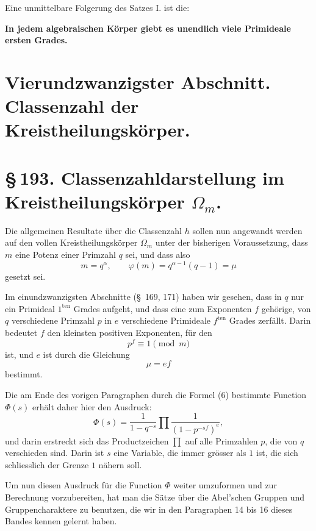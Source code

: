 \documentclass[11pt]{article}
\begin{document}
Eine unmittelbare Folgerung des Satzes I. ist die:
\begin{center}
\textbf{In jedem algebraischen Körper giebt es unendlich viele Primideale ersten Grades.}
\end{center}

\section*{Vierundzwanzigster Abschnitt.\\Classenzahl der Kreistheilungskörper.}
\section*{\S\,193. Classenzahldarstellung im Kreistheilungskörper $\Omega_m$.}

Die allgemeinen Resultate über die Classenzahl $h$ sollen nun angewandt werden auf den vollen Kreistheilungskörper $\Omega_m$ unter der bisherigen Voraussetzung, dass $m$ eine Potenz einer Primzahl $q$ sei, und dass also
\begin{equation}
m=q^\alpha,\qquad \varphi(m)=q^{\alpha-1}(q-1)=\mu
\tag{1}
\end{equation}
gesetzt sei.

Im einundzwanzigsten Abschnitte (\S~169, 171) haben wir gesehen, dass in $q$ nur ein Primideal $1^{\mathrm{ten}}$ Grades aufgeht, und dass eine zum Exponenten $f$ gehörige, von $q$ verschiedene Primzahl $p$ in $e$ verschiedene Primideale $f^{\mathrm{ten}}$ Grades zerfällt. Darin bedeutet $f$ den kleinsten positiven Exponenten, für den
\begin{equation}
p^f\equiv1\pmod m
\tag{2}
\end{equation}
ist, und $e$ ist durch die Gleichung
\begin{equation}
\mu=ef
\tag{3}
\end{equation}
bestimmt.

Die am Ende des vorigen Paragraphen durch die Formel (6) bestimmte Function $\Phi(s)$ erhält daher hier den Ausdruck:
\begin{equation}
\Phi(s)=\frac1{1-q^{-s}}\prod\frac1{(1-p^{-sf})^e},
\tag{4}
\end{equation}
und darin erstreckt sich das Productzeichen $\prod$ auf alle Primzahlen $p$, die von $q$ verschieden sind. Darin ist $s$ eine Variable, die immer grösser als $1$ ist, die sich schliesslich der Grenze $1$ nähern soll.

Um nun diesen Ausdruck für die Function $\Phi$ weiter umzuformen und zur Berechnung vorzubereiten, hat man die Sätze über die Abel'schen Gruppen und Gruppencharaktere zu benutzen, die wir in den Paragraphen 14 bis 16 dieses Bandes kennen gelernt haben.
\end{document}
